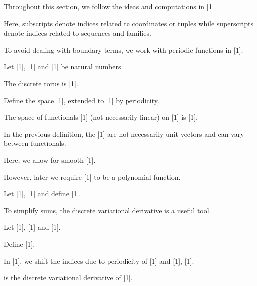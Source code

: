 \documentclass{amsart}
\begin{document}
\noindent {\color{green} ********************}

\noindent 

\noindent {\color{green} ********************}



\noindent {\color{green} ********************}

\noindent  Throughout this section, we follow the ideas and computations in [1].

\noindent   Here, subscripts denote indices related to coordinates or tuples while superscripts denote indices related to sequences and families.

\noindent   To avoid dealing with boundary terms, we work with periodic functions in [1].

\noindent   Let [1], [1] and [1] be natural numbers.

\noindent   The discrete torus is [1].

\noindent   Define the space [1], extended to [1] by periodicity.

\noindent   The space of functionals [1] (not necessarily linear) on [1] is [1].

\noindent   In the previous definition, the [1] are not necessarily unit vectors and can vary between functionals.

\noindent   Here, we allow for smooth [1].

\noindent   However, later we require [1] to be a polynomial function.

\noindent   Let [1], [1] and define [1].

\noindent   To simplify sums, the discrete variational derivative is a useful tool.

\noindent   Let [1], [1] and [1].

\noindent   Define [1].

\noindent   In [1], we shift the indices due to periodicity of [1] and [1], [1].

\noindent   [1] is the discrete variational derivative of [1].

\noindent  

\noindent {\color{green} ********************}


\end{document}
